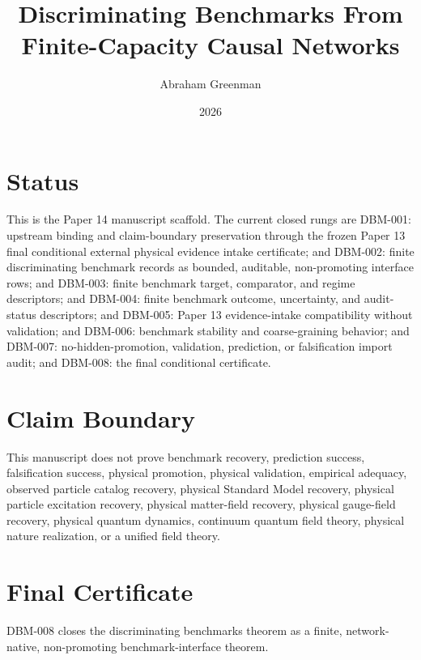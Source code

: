 \documentclass{article}
\title{Discriminating Benchmarks From Finite-Capacity Causal Networks}
\author{Abraham Greenman}
\date{2026}
\begin{document}
\maketitle

\section{Status}

This is the Paper 14 manuscript scaffold. The current closed rungs are DBM-001:
upstream binding and claim-boundary preservation through the frozen Paper 13
final conditional external physical evidence intake certificate; and DBM-002:
finite discriminating benchmark records as bounded, auditable, non-promoting
interface rows; and DBM-003: finite benchmark target, comparator, and regime
descriptors; and DBM-004: finite benchmark outcome, uncertainty, and
audit-status descriptors; and DBM-005: Paper 13 evidence-intake compatibility
without validation; and DBM-006: benchmark stability and coarse-graining
behavior; and DBM-007: no-hidden-promotion, validation, prediction, or
falsification import audit; and DBM-008: the final conditional certificate.

\section{Claim Boundary}

This manuscript does not prove benchmark recovery, prediction success,
falsification success, physical promotion, physical validation, empirical
adequacy, observed particle catalog recovery, physical Standard Model
recovery, physical particle excitation recovery, physical matter-field
recovery, physical gauge-field recovery, physical quantum dynamics, continuum
quantum field theory, physical nature realization, or a unified field theory.

\section{Final Certificate}

DBM-008 closes the discriminating benchmarks theorem as a finite,
network-native, non-promoting benchmark-interface theorem.
\end{document}

